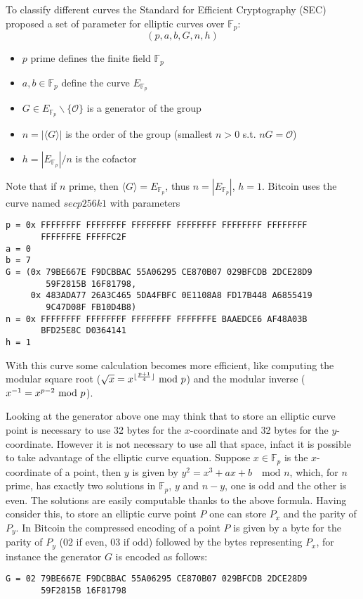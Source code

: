 To classify different curves the Standard for Efficient Cryptography (SEC) proposed a set of parameter for elliptic curves over $\mathbb{F}_p$:
\begin{equation}
(p, a, b, G, n, h)
\end{equation}
\begin{itemize}
	\item $p$ prime defines the finite field $\mathbb{F}_p$
	\item $a, b \in \mathbb{F}_p$ define the curve $E_{\mathbb{F}_p}$
	\item $G\in E_{\mathbb{F}_p}\backslash \{\mathcal{O}\}$ is a generator of the group
	\item $n = |\langle G \rangle|$ is the order of the group (smallest $n>0$ s.t. $nG = \mathcal{O}$)
	\item $h = |E_{\mathbb{F}_p}| / n$ is the cofactor
\end{itemize}
Note that if $n$ prime, then $\langle G \rangle = E_{\mathbb{F}_p}$, thus $n = |E_{\mathbb{F}_p}|$, $h=1$.
Bitcoin uses the curve named $secp256k1$ with parameters
\begin{verbatim}
p = 0x FFFFFFFF FFFFFFFF FFFFFFFF FFFFFFFF FFFFFFFF FFFFFFFF 
       FFFFFFFE FFFFFC2F
a = 0
b = 7
G = (0x 79BE667E F9DCBBAC 55A06295 CE870B07 029BFCDB 2DCE28D9 
        59F2815B 16F81798, 
     0x 483ADA77 26A3C465 5DA4FBFC 0E1108A8 FD17B448 A6855419 
        9C47D08F FB10D4B8)
n = 0x FFFFFFFF FFFFFFFF FFFFFFFF FFFFFFFE BAAEDCE6 AF48A03B 
       BFD25E8C D0364141
h = 1
\end{verbatim}
With this curve some calculation becomes more efficient, like computing the modular square root ($\sqrt{x}=x^{\lfloor\frac{p+1}{4}\rfloor}\textmd{ mod }p$) and the modular inverse ($x^{-1}=x^{p-2}\textmd{ mod }p$).

Looking at the generator above one may think that to store an elliptic curve point is necessary to use 32 bytes for the $x$-coordinate and 32 bytes for the $y$-coordinate. 
However it is not necessary to use all that space, infact it is possible to take advantage of the elliptic curve equation. Suppose $x \in \mathbb{F}_p$ is the $x$-coordinate of a point, then $y$ is given by $y^2 = x^3 + ax + b \quad \text{mod }n$, which, for $n$ prime, has exactly two solutions in $\mathbb{F}_p$, $y$ and $n-y$, one is odd and the other is even.
The solutions are easily computable thanks to the above formula.
Having consider this, to store an elliptic curve point $P$ one can store $P_x$ and the parity of $P_y$. 
In Bitcoin the compressed encoding of a point $P$ is given by a byte for the parity of $P_y$ ($02$ if even, $03$ if odd) followed by the bytes representing $P_x$, for instance the generator $G$ is encoded as follows:
\begin{verbatim}
G = 02 79BE667E F9DCBBAC 55A06295 CE870B07 029BFCDB 2DCE28D9 
       59F2815B 16F81798
\end{verbatim}

